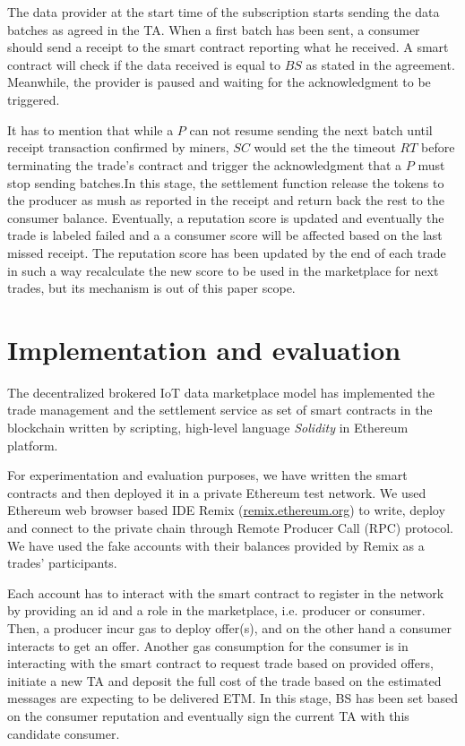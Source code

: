 \documentclass[letterpaper, 10 pt, conference]{ieeeconf}  %
\newcommand{\rtEst}{\ensuremath{\widehat{\mathit{RT}}}}
\begin{document}
The data provider at the start time of the subscription starts sending the data batches as agreed in the TA. When a first batch has been sent, a consumer should send a receipt to the smart contract reporting what he received. A smart contract will check if the data received is equal to $BS$ as stated in the agreement. Meanwhile, the provider is paused and waiting for the acknowledgment to be triggered. 

It has to mention that while a $P$ can not resume sending the next batch until receipt transaction confirmed by miners, $SC$ would set the the timeout \rtEst{} before terminating the trade's contract and trigger the acknowledgment that a $P$ must stop sending batches.In this stage, the settlement function release the tokens to the producer as mush as reported in the receipt and return back the rest to the consumer balance. Eventually, a reputation score is updated and eventually the trade is labeled failed and a a consumer score will be affected based on the last missed receipt. The reputation score has been updated by the end of each trade in such a way recalculate the new score to be used in the marketplace for next trades, but its mechanism is out of this paper scope.


\section{Implementation and evaluation} \label{sec:evaluation}

The decentralized brokered IoT data marketplace model has implemented the trade management and the settlement service as set of smart contracts in the blockchain written by scripting, high-level language \textit{Solidity} in Ethereum platform. 

For experimentation and evaluation purposes, we have written the smart contracts and then deployed it in a private Ethereum test network. We used Ethereum web browser based IDE Remix (\url{remix.ethereum.org}) to write, deploy and connect to the private chain through Remote Producer Call (RPC) protocol. We have used the fake accounts with their balances provided by Remix as a trades’ participants. 

Each account has to interact with the smart contract to register in the network by providing an id and a role in the marketplace, i.e. producer or consumer. Then, a producer incur gas to deploy offer(s), and on the other hand a consumer interacts to get an offer. Another gas consumption for the consumer is in interacting with the smart contract to request trade based on provided offers, initiate a new TA and deposit the full cost of the trade based on the estimated messages are expecting to be delivered ETM. In this stage, BS has been set based on the consumer reputation and eventually sign the current TA with this candidate consumer. 
\end{document}
